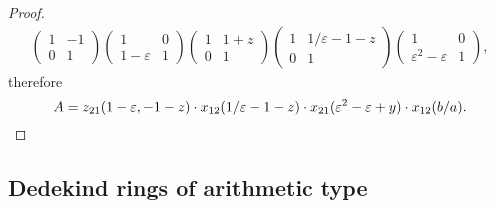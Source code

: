 \begin{proof}
\begin{multline*}
\begin{pmatrix} 1 & -1 \\ 0 & 1 \end{pmatrix}
\begin{pmatrix} 1 & 0 \\ 1-\varepsilon & 1 \end{pmatrix}
\begin{pmatrix} 1 & 1+z \\ 0 & 1 \end{pmatrix}
\begin{pmatrix} 1 & 1/\varepsilon-1-z \\ 0 & 1 \end{pmatrix}
\begin{pmatrix} 1 & 0 \\ \varepsilon^2-\varepsilon & 1 \end{pmatrix},
\end{multline*}
therefore
\[
A=z_{21}(1-\varepsilon,-1-z)\cdot x_{12}(1/\varepsilon-1-z)\cdot x_{21}(\varepsilon^2-\varepsilon+y)\cdot x_{12}(b/a). \qedhere
\]
\end{proof}

\subsection{Dedekind rings of arithmetic type}
